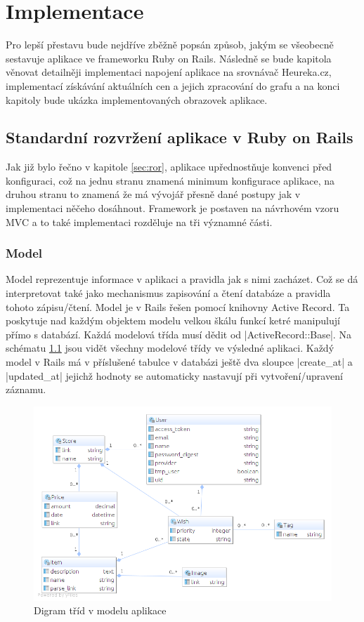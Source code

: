 \chapter{Implementace}
Pro lepší přestavu bude nejdříve zběžně popsán způsob, jakým se všeobecně sestavuje aplikace ve frameworku Ruby on Rails. Následně se bude kapitola věnovat detailněji implementaci napojení aplikace na srovnávač Heureka.cz, implementací získávání aktuálních cen a jejich zpracování do grafu a na konci kapitoly bude ukázka implementovaných obrazovek aplikace.

\section{Standardní rozvržení aplikace v Ruby on Rails}
Jak již bylo řečno v kapitole \ref{sec:ror}, aplikace upřednostňuje konvenci před konfiguraci, což na jednu stranu znamená minimum konfigurace aplikace, na druhou stranu to znamená že má vývojář přesně dané postupy jak v implementaci něčeho dosáhnout. Framework je postaven na návrhovém vzoru MVC a to také implementaci rozděluje na tři významné části.

\subsection{Model}
Model reprezentuje informace v aplikaci a pravidla jak s nimi zacházet. Což se dá interpretovat také jako mechanismus zapisování a čtení databáze a pravidla tohoto zápisu/čtení. Model je v Rails řešen pomocí knihovny Active Record. Ta poskytuje nad každým objektem modelu velkou škálu funkcí ketré manipulují přímo s databází. Každá modelová třída musí dědit od |ActiveRecord::Base|. Na schématu \ref{fig:model-diagram} jsou vidět všechny modelové třídy ve výsledné aplikaci. Každý model v Rails má v příslušené tabulce v databázi ještě dva sloupce |create_at| a |updated_at| jejichž hodnoty se automaticky nastavují při vytvoření/upravení záznamu.

\begin{figure}[htb]
\begin{center}
\includegraphics[width=120mm]{./pictures/model-diagram.png}
\caption{Digram tříd v modelu aplikace}
\label{fig:model-diagram}
\end{center}
\end{figure}

